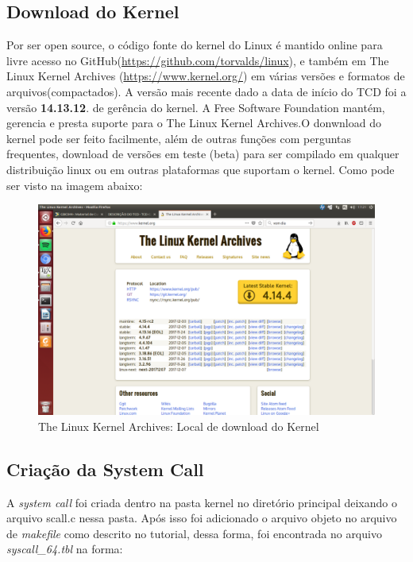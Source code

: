 \documentclass[12pt]{article}
\begin{document}
\subsection*{Download do Kernel}
Por ser open source, o código fonte do kernel do Linux é mantido online para livre acesso no GitHub(\url{https://github.com/torvalds/linux}), e também em The Linux Kernel Archives (\url{https://www.kernel.org/}) em várias versões e formatos de arquivos(compactados). A versão mais recente dado a data de início do TCD foi a versão \textbf{14.13.12}.
de gerência do kernel.
	A Free Software Foundation mantém, gerencia e presta suporte para o The Linux Kernel Archives.O donwnload do kernel pode ser feito facilmente, além de outras funções com perguntas frequentes, download de versões em teste (beta) para ser compilado em qualquer distribuição linux ou em outras plataformas que suportam o kernel.
	\vspace*{2cm}
	 Como pode ser visto na imagem abaixo:
\begin{figure}[!h]
	\centering
	\includegraphics[scale=0.2]{imagens/kernelorg.png}
	\caption{The Linux Kernel Archives: Local de download do Kernel}
	\label{kernelorg}
\end{figure}
\subsection*{Criação da System Call}
A \textit{system call} foi criada dentro na pasta kernel no diretório principal deixando o arquivo  scall.c nessa pasta. Após isso foi adicionado o arquivo objeto no arquivo de \textit{makefile} como descrito no tutorial, dessa forma, foi encontrada no arquivo \textit{syscall\_64.tbl} na forma: \newline
\end{document}
